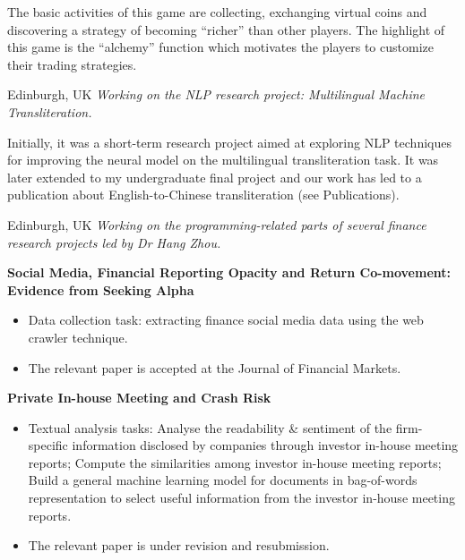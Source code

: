 \documentclass[%
               doublesided,
               paper=a4,
               fontsize=11pt
              ]{my-resume}
\begin{document}
{\small The  basic  activities  of  this  game  are  collecting,  exchanging  virtual  coins  and  discovering  a strategy of becoming ``richer'' than other players. The highlight of this game is the ``alchemy'' function which motivates the players to customize their trading strategies.}

\divider

     {Edinburgh, UK}
\textit{\small Working on the NLP research project: Multilingual Machine Transliteration.}

\smallskip
{\small Initially, it was a short-term research project aimed at exploring NLP techniques for improving the neural model on the multilingual transliteration task. It was later extended to my undergraduate final project and our work has led to a publication about English-to-Chinese transliteration (see Publications)}.

\divider

     {Edinburgh, UK}
\textit{\small Working on the programming-related parts of several finance research projects led by Dr Hang Zhou.}
\smallskip

{\small
\textbf{Social Media, Financial Reporting Opacity and Return Co-movement: Evidence from Seeking Alpha}
\smallskip
\begin{itemize}
    \item Data collection task: extracting finance social media data using the web crawler technique.
    \item The relevant paper is accepted at the Journal of Financial Markets.
\end{itemize}
\smallskip

\textbf{Private In-house Meeting and Crash Risk}
\begin{itemize}
    \item Textual analysis tasks:  Analyse the readability \& sentiment of the firm-specific information disclosed by companies through investor in-house meeting reports; 
     Compute the similarities among investor in-house meeting reports;
     Build a general machine learning model for documents in bag-of-words representation to select useful information from the investor in-house meeting reports.
    \item The relevant paper is under revision and resubmission.
\end{itemize}
}
\end{document}
